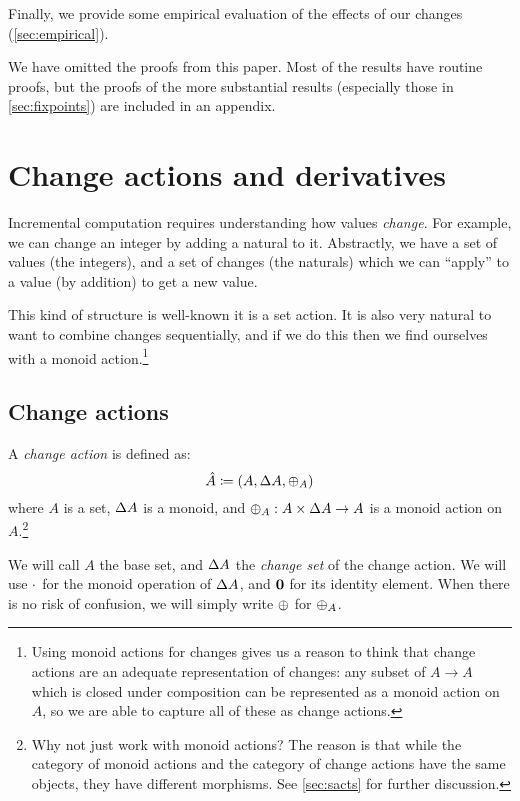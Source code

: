 Finally, we provide some empirical evaluation of the effects
of our changes (\cref{sec:empirical}).

We have omitted the proofs from this paper. Most of the results have routine
proofs, but the proofs of the more substantial results
(especially those in \cref{sec:fixpoints}) are included in an appendix.

\section{Change actions and derivatives}
\label{sec:changeActions}

Incremental computation requires understanding how values \emph{change}. For
example, we can change an integer by adding a natural to it.
Abstractly, we have a set of values (the integers), and a set of changes
(the naturals) which we can ``apply'' to a value (by addition) to get a new value.

This kind of structure is well-known \textemdash{} it is a set action. It is
also very natural to want to combine changes sequentially, and if we do this
then we find ourselves with a monoid action.\footnote{
Using monoid actions for changes gives us a reason to think that
change actions are an adequate representation of changes: any subset of $A
\rightarrow A$ which is closed under composition can be
represented as a monoid action on $A$, so we are able to capture all of these as change
actions.}

\subsection{Change actions}
\label{sec:changeAction}

\begin{defn}
  A \emph{change action} is defined as:
  \begin{displaymath}
    \hat{A} \coloneqq (A,\Delta A,\oplus_A)
  \end{displaymath}
  where $A$ is a set, $\Delta A$ is a monoid, and $\oplus_A : A \times \Delta A \rightarrow A$ is a monoid action on $A$.\footnote{Why not
    just work with monoid actions? The reason is that while the category of
    monoid actions and the category of change actions have the same objects, they
  have different morphisms. See \cref{sec:sacts} for further discussion.}

  We will call $A$ the base set, and $\Delta A$ the \emph{change set} of the change
  action. We will use $\cdot$ for the monoid operation of $\Delta A$, and
  $\mathbf{0}$ for its identity element. 
  When there is no risk of confusion, we will simply write $\oplus$ for $\oplus_A$.
\end{defn}

